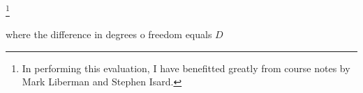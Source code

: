 

\citet{Coltheart1977}

\citet{Hayes2008a}
\citet{Albright2009a}


\citet{EM}

\footnote{In performing this evaluation, I have benefitted greatly from course notes by Mark Liberman and Stephen Isard.}


where the difference in degrees o freedom equals $D$

